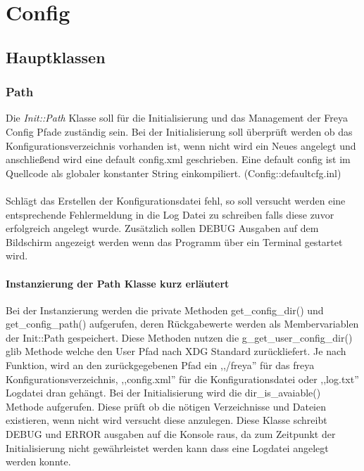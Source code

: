 \section{Config}
\subsection{Hauptklassen}


\subsubsection{Path}
Die \emph{Init::Path} Klasse soll für die Initialisierung und das Management der Freya Config Pfade zuständig sein.
Bei der Initialisierung soll überprüft werden ob das Konfigurationsverzeichnis vorhanden ist, wenn nicht wird ein Neues
angelegt und anschließend wird eine default config.xml geschrieben. Eine default config ist im Quellcode als 
globaler konstanter String einkompiliert. (Config::defaultcfg.inl)
\\
\\
Schlägt das Erstellen der Konfigurationsdatei fehl, so soll versucht werden eine entsprechende Fehlermeldung in die Log Datei zu schreiben 
falls diese zuvor erfolgreich angelegt wurde. Zusätzlich sollen DEBUG Ausgaben auf dem Bildschirm angezeigt werden wenn das Programm
über ein Terminal gestartet wird.

\paragraph{Instanzierung der Path Klasse kurz erläutert}
Bei der Instanzierung werden die private Methoden get\_config\_dir() und get\_config\_path() aufgerufen, deren Rückgabewerte werden
als Membervariablen der Init::Path gespeichert. Diese Methoden nutzen die g\_get\_user\_config\_dir() glib Methode
welche den User Pfad nach XDG Standard zurückliefert.
Je nach Funktion, wird an den zurückgegebenen Pfad ein ,,/freya'' für das freya Konfigurationsverzeichnis, ,,config.xml''
für die Konfigurationsdatei oder ,,log.txt'' Logdatei dran gehängt. Bei der Initialisierung wird die dir\_is\_avaiable()
Methode aufgerufen. Diese prüft ob die nötigen Verzeichnisse und Dateien existieren, wenn nicht wird versucht diese
anzulegen. Diese Klasse schreibt DEBUG und ERROR ausgaben auf die Konsole raus, da zum Zeitpunkt der Initialisierung
nicht gewährleistet werden kann dass eine Logdatei angelegt werden konnte.


